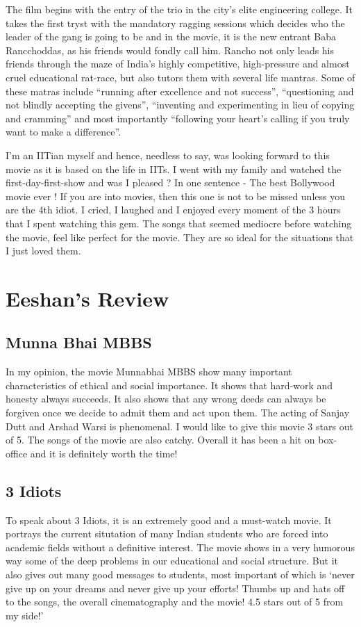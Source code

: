 \documentclass{article}
\begin{document}
The film begins with the entry of the trio in the city's elite engineering college. It takes the first tryst with the mandatory ragging sessions which decides who the leader of the gang is going to be and in the movie, it is the new entrant Baba Rancchoddas, as his friends would fondly call him. Rancho not only leads his friends through the maze of India's highly competitive, high-pressure and almost cruel educational rat-race, but also tutors them with several life mantras. Some of these matras include ``running after excellence and not success'', ``questioning and not blindly accepting the givens'', ``inventing and experimenting in lieu of copying and cramming'' and most importantly ``following your heart's calling if you truly want to make a difference''.


I'm an IITian myself and hence, needless to say, was looking forward to this movie as it is based on the life in IITs. I went with my family and watched the first-day-first-show and was I pleased ? In one sentence - The best Bollywood movie ever ! If you are into movies, then this one is not to be missed unless you are the 4th idiot. I cried, I laughed and I enjoyed every moment of the 3 hours that I spent watching this gem. The songs that seemed mediocre before watching the movie, feel like perfect for the movie. They are so ideal for the situations that I just loved them.

\section{Eeshan's Review}
\subsection{Munna Bhai MBBS}
In my opinion, the movie Munnabhai MBBS show many important characteristics of ethical and social importance. It shows that hard-work and honesty always succeeds. It also shows that any wrong deeds can always be forgiven once we decide to admit them and act upon them. The acting of Sanjay Dutt and Arshad Warsi is phenomenal. I would like to give this movie 3 stars out of 5. The songs of the movie are also catchy. Overall it has been a hit on box-office and it is definitely worth the time! 
\subsection{3 Idiots}
To speak about 3 Idiots, it is an extremely good and a must-watch movie. It portrays the current situtation of many Indian students who are forced into academic fields without a definitive interest. The movie shows in a very humorous way some of the deep problems in our educational and social structure. But it also gives out many good messages to students, most important of which is `never give up on your dreams and never give up your efforts! Thumbs up and hats off to the songs, the overall cinematography and the movie! 4.5 stars out of 5 from my side!'
\end{document}
